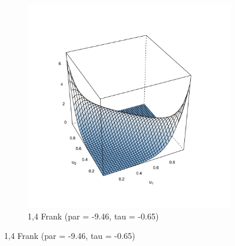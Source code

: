 \documentclass{article}
\begin{document}
\begin{samepage}
\begin{figure}[h]
\begin{subfigure}[b]{0.475\textwidth}
      \includegraphics[width=\textwidth]{2}
      \caption[]%
      {{\small 1,4 Frank (par = -9.46, tau = -0.65)}}
      \label{fig:b}
    \end{subfigure}


\end{figure}
\end{samepage}
\end{document}
